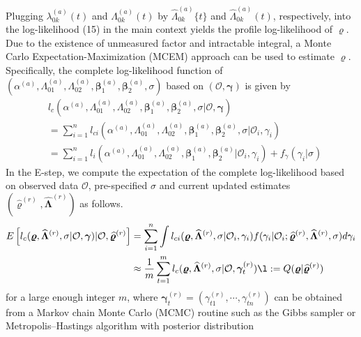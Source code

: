 \documentclass[12pt]{article}
\def\bfbeta{\bm{\beta}}
\def\bfvarrho{\bm{\varrho}}
\def\bfgamma{\bm{\gamma}}
\def\bfLambda{\bm{\Lambda}}
\begin{document}
Plugging $\lambda_{0k}^{(a)}(t)$ and $\Lambda_{0k}^{(a)}(t)$ by $\widehat{\Lambda}_{0k}^{(a)}\{t\}$ and $\widehat{\Lambda}_{0k}^{(a)}(t)$, respectively, into the log-likelihood (15) in the main context %
yields the profile log-likelihood of $\bfvarrho$. Due to the existence of unmeasured factor and intractable integral, a Monte Carlo Expectation-Maximization (MCEM) approach can be used to estimate $\bfvarrho$. Specifically, the complete log-likelihood function of $(\alpha^{(a)},\Lambda_{01}^{(a)},\Lambda_{02}^{(a)},\bfbeta_{1}^{(a)},\bfbeta_{2}^{(a)},\sigma)$ based on $(\mathcal{O},\bfgamma)$ is given by 
\begin{equation}
\begin{split}
&l_c(\alpha^{(a)},\Lambda_{01}^{(a)},\Lambda_{02}^{(a)},\bfbeta_{1}^{(a)},\bfbeta_{2}^{(a)},\sigma|\mathcal{O},\bfgamma) \\
&= \sum\limits_{i=1}^n l_{ci}(\alpha^{(a)},\Lambda_{01}^{(a)},\Lambda_{02}^{(a)},\bfbeta_{1}^{(a)},\bfbeta_{2}^{(a)},\sigma|\mathcal{O}_i,\gamma_i) \\
&= \sum\limits_{i=1}^n l_i(\alpha^{(a)},\Lambda_{01}^{(a)},\Lambda_{02}^{(a)},\bfbeta_{1}^{(a)},\bfbeta_{2}^{(a)}|\mathcal{O}_i,\gamma_i)+f_{\gamma}(\gamma_i|\sigma)
\end{split}
\end{equation}
In the E-step, we compute the expectation of the complete log-likelihood based on observed data $\mathcal{O}$, pre-specified $\sigma$ and current updated estimates $(\widehat{\bfvarrho}^{(r)},\widehat{\bfLambda}^{(r)})$ as follows.
\begin{equation}
\begin{split}
E\left[l_c(\bfvarrho,\widehat{\bfLambda}^{(r)},\sigma|\mathcal{O},\bfgamma)|\mathcal{O},\widehat{\bfvarrho}^{(r)}\right]& = \sum\limits_{i=1}^n \int l_{ci}(\bfvarrho,\widehat{\bfLambda}^{(r)},\sigma|\mathcal{O}_i,\gamma_i) f(\gamma_i|\mathcal{O}_i;\widehat{\bfvarrho}^{(r)},\widehat{\bfLambda}^{(r)},\sigma) d\gamma_i\\
&\approx \frac{1}{m}\sum\limits_{t=1}^m l_c(\bfvarrho,\widehat{\bfLambda}^{(r)},\sigma|\mathcal{O},\bfgamma_t^{(r)})
\l:= Q(\bfvarrho|\widehat{\bfvarrho}^{(r)})
\end{split}
\end{equation}
for a large enough integer $m$, where $\bfgamma_t^{(r)}=(\gamma_{t1}^{(r)},\cdots, \gamma_{tn}^{(r)})$ can be obtained from a Markov chain Monte Carlo (MCMC) routine such as the Gibbs sampler or
Metropolis–Hastings algorithm with posterior distribution 
\end{document}
